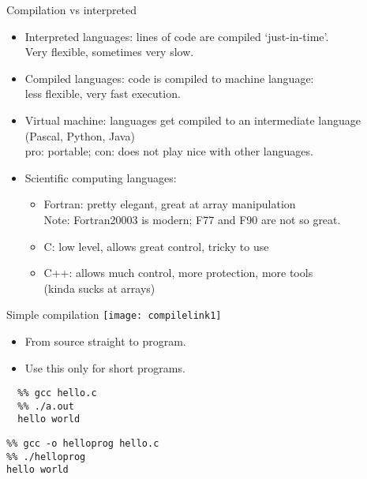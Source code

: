 \documentclass[11pt,headernav]{beamer}
\begin{document}
\begin{numberedframe}{Compilation vs interpreted}
  \begin{itemize}
  \item Interpreted languages: lines of code are compiled `just-in-time'.\\
    Very flexible, sometimes very slow.
  \item Compiled languages: code is compiled to machine language:\\
    less flexible, very fast execution.
  \item Virtual machine: languages get compiled to an intermediate language\\
    (Pascal, Python, Java)\\
    pro: portable; con: does not play nice with other languages.
  \item Scientific computing languages:
    \begin{itemize}
    \item Fortran: pretty elegant, great at array manipulation\\
      Note: Fortran20003 is modern; F77 and F90 are not so great.
    \item C: low level, allows great control, tricky to use
    \item C++: allows much control, more protection, more tools\\
      (kinda sucks at arrays)
    \end{itemize}
  \end{itemize}
\end{numberedframe}

\begin{numberedframe}{Simple compilation}
  \label{sl-tut:compile1}
  \texttt{[image: compilelink1]}
  \begin{itemize}
  \item From source straight to program.
  \item Use this only for short programs.
  \end{itemize}
  \begin{multicols}{2}
    \small
\begin{verbatim}
  %% gcc hello.c
  %% ./a.out
  hello world
\end{verbatim}
\columnbreak
\begin{verbatim}
%% gcc -o helloprog hello.c
%% ./helloprog
hello world
\end{verbatim}
  \end{multicols}
\end{numberedframe}
\end{document}
